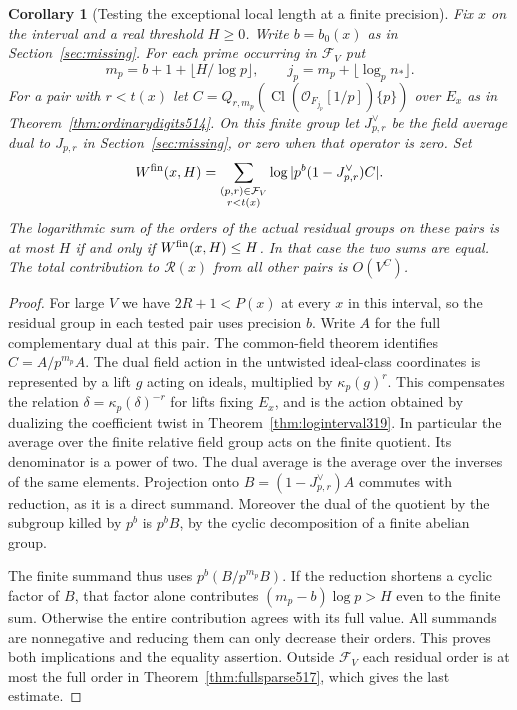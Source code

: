 \documentclass[a4paper,11pt]{article}
\newtheorem{corollary}[proposition]{Corollary}
\theoremstyle{definition}
\theoremstyle{remark}
\numberwithin{equation}{section}
\newcommand{\Cl}{\operatorname{Cl}}
\begin{document}
\begin{corollary}[Testing the exceptional local length at a finite precision]
\leavevmode\label{cor:exactbudget517}
Fix \(x\) on the interval and a real threshold \(H\ge0\).
Write \(b=b_0(x)\) as in Section~\ref{sec:missing}.
For each prime occurring in \(\mathcal F_V\) put
\[
   m_p=b+1+\lfloor H/\log p\rfloor,\qquad
   j_p=m_p+\lfloor\log_p n_*\rfloor .
\]
For a pair with \(r<t(x)\) let
\(C=Q_{r,m_p}(\Cl(\mathcal O_{F_{j_p}}[1/p])\{p\})\)
over \(E_x\) as in Theorem~\ref{thm:ordinarydigits514}.
On this finite group let \(J^\vee_{p,r}\) be the field average
dual to \(J_{p,r}\) in Section~\ref{sec:missing}, or zero when
that operator is zero. Set
\[
  W^{\rm fin}(x,H)=
      \sum_{\substack{(p,r)\in\mathcal F_V\\r<t(x)}}
                    \log|p^b(1-J^\vee_{p,r})C|.
\]
The logarithmic sum of the orders of the actual residual groups
on these pairs is at most \(H\) if and only if
\(W^{\rm fin}(x,H)\le H\). In that case the two sums are equal.
The total contribution to \(\mathcal R(x)\) from all other pairs
is \(O(V^C)\).
\end{corollary}
\begin{proof}
For large \(V\) we have \(2R+1<P(x)\) at every \(x\) in this
interval, so the residual group in each tested pair uses
precision \(b\). Write \(A\) for the full complementary dual at
this pair. The common-field theorem identifies \(C=A/p^{m_p}A\).
The dual field action in the untwisted ideal-class coordinates
is represented by a lift \(g\) acting on ideals, multiplied by
\(\kappa_p(g)^r\). This compensates the relation
\(\delta=\kappa_p(\delta)^{-r}\) for lifts fixing \(E_x\), and
is the action obtained by dualizing the coefficient twist in
Theorem~\ref{thm:loginterval319}. In particular the average
over the finite relative field group acts on the finite quotient.
Its denominator is a power of two. The dual average is the
average over the inverses of the same elements. Projection onto
\(B=(1-J^\vee_{p,r})A\) commutes with reduction, as it is a
direct summand. Moreover the dual of the quotient by the subgroup
killed by \(p^b\) is \(p^bB\), by the cyclic decomposition of a
finite abelian group.

The finite summand thus uses \(p^b(B/p^{m_p}B)\). If the
reduction shortens a cyclic factor of \(B\), that factor alone
contributes \((m_p-b)\log p>H\) even to the finite sum.
Otherwise the entire contribution agrees with its full value.
All summands are nonnegative and reducing them can only
decrease their orders. This proves both implications and
the equality assertion. Outside \(\mathcal F_V\) each residual
order is at most the full order in Theorem~\ref{thm:fullsparse517},
which gives the last estimate.
\end{proof}
\end{document}
